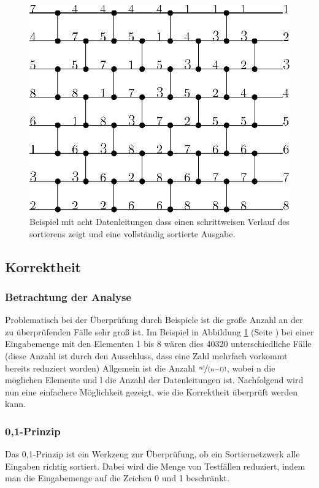 \documentclass[11pt]{article}
\begin{document}
\begin{figure}
\begin{center}
\includegraphics[scale=1]{bild2beispiel.eps}
\caption{Beispiel mit acht Datenleitungen dass einen schrittweisen Verlauf des sortierens zeigt und eine vollständig sortierte Ausgabe.}
\label{fig:kompnetnumbex}
\end{center}
\end{figure}
\FloatBarrier
\subsection{Korrektheit}
\subsubsection{Betrachtung der Analyse}
Problematisch bei der Überprüfung durch Beispiele ist die große Anzahl an der zu überprüfenden Fälle sehr groß ist. Im Beispiel in Abbildung \ref{fig:kompnetnumbex} (Seite \pageref{fig:kompnetnumbex}) bei einer Eingabemenge mit den Elementen 1 bis 8 wären dies 40320 unterschiedliche Fälle (diese Anzahl ist durch den Ausschluss, dass eine Zahl mehrfach vorkommt bereits reduziert worden) Allgemein ist die Anzahl $\nicefrac{n!}{(n-l)!}$, wobei n die möglichen Elemente und l die Anzahl der Datenleitungen ist. Nachfolgend wird nun eine einfachere Möglichkeit gezeigt, wie die Korrektheit überprüft werden kann.
\subsubsection{0,1-Prinzip}
Das 0,1-Prinzip ist ein Werkzeug zur Überprüfung, ob ein Sortiernetzwerk alle Eingaben richtig sortiert. Dabei wird die Menge von Testfällen reduziert, indem man die Eingabemenge auf die Zeichen 0 und 1 beschränkt.
\end{document}
